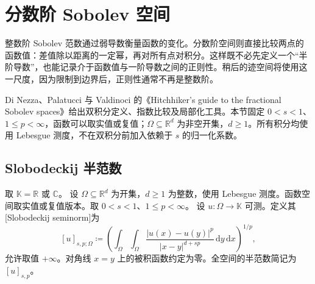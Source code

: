 \section{分数阶 Sobolev 空间}
\label{b1:sec:2302}

整数阶 Sobolev 范数通过弱导数衡量函数的变化。分数阶空间则直接比较两点的函数值：差值除以距离的一定幂，再对所有点对积分。这样既不必先定义一个“半阶导数”，也能记录介于函数值与一阶导数之间的正则性。稍后的迹空间将使用这一尺度，因为限制到边界后，正则性通常不再是整数阶。

\ProseParagraphBreak

Di Nezza、Palatucci 与 Valdinoci 的《Hitchhiker's guide to the fractional Sobolev spaces》\cite[Section 2 and Lemmas 5.1--5.3]{DiNezza2012Hitchhikers}给出双积分定义、指数比较及局部化工具。本节固定 \(0<s<1\)、\(1\leq p<\infty\)，函数可以取实值或复值；\(\Omega\subseteq\mathbb R^d\) 为非空开集，\(d\geq1\)。所有积分均使用 Lebesgue 测度，不在双积分前加入依赖于 \(s\) 的归一化系数。


\subsection{Slobodeckij 半范数}
\label{b1:subsec:230201}

\begin{definition}\label{b1:def:slobodeckij-seminorm}
取 \(\mathbb K=\mathbb R\) 或 \(\mathbb C\)。
设 \(\Omega\subseteq\mathbb R^d\) 为开集，\(d\geq1\) 为整数，使用 Lebesgue 测度。函数空间取实值或复值版本。取 \(0<s<1\)、\(1\leq p<\infty\)。
设 \(u:\Omega\rightarrow\mathbb K\) 可测。定义其[Slobodeckij seminorm]为
\begin{equation}\label{b1:eq:slobodeckij-seminorm}
 [u]_{s,p;\Omega}
 \coloneqq\left(\int_\Omega\int_\Omega
       \frac{|u(x)-u(y)|^p}{|x-y|^{d+sp}}\,\mathrm dy\,\mathrm dx\right)^{1/p},
\end{equation}
允许取值 \(+\infty\)。对角线 \(x=y\) 上的被积函数约定为零。全空间的半范数简记为 \([u]_{s,p}\)。
\end{definition}

